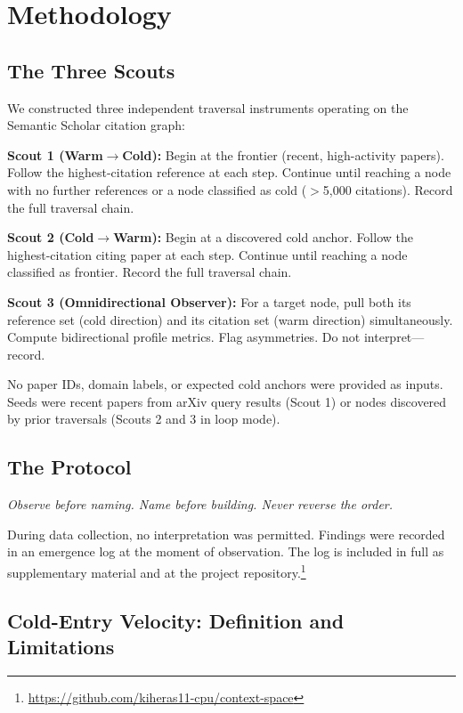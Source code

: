 \documentclass[11pt]{article}
\begin{document}
\section{Methodology}

\subsection{The Three Scouts}

We constructed three independent traversal instruments operating on the Semantic Scholar citation graph:

\textbf{Scout 1 (Warm$\to$Cold):} Begin at the frontier (recent, high-activity papers). Follow the highest-citation reference at each step. Continue until reaching a node with no further references or a node classified as cold ($>$5,000 citations). Record the full traversal chain.

\textbf{Scout 2 (Cold$\to$Warm):} Begin at a discovered cold anchor. Follow the highest-citation citing paper at each step. Continue until reaching a node classified as frontier. Record the full traversal chain.

\textbf{Scout 3 (Omnidirectional Observer):} For a target node, pull both its reference set (cold direction) and its citation set (warm direction) simultaneously. Compute bidirectional profile metrics. Flag asymmetries. Do not interpret---record.

No paper IDs, domain labels, or expected cold anchors were provided as inputs. Seeds were recent papers from arXiv query results (Scout 1) or nodes discovered by prior traversals (Scouts 2 and 3 in loop mode).

\subsection{The Protocol}

\textit{Observe before naming. Name before building. Never reverse the order.}

During data collection, no interpretation was permitted. Findings were recorded in an emergence log at the moment of observation. The log is included in full as supplementary material and at the project repository.\footnote{\url{https://github.com/kiheras11-cpu/context-space}}

\subsection{Cold-Entry Velocity: Definition and Limitations}
\end{document}
